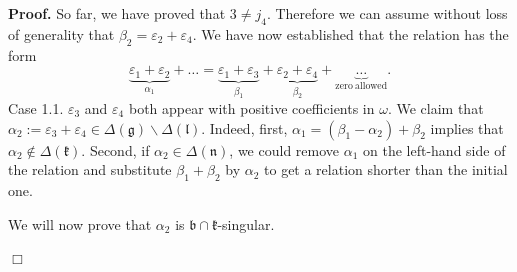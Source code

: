 \documentclass[12pt]{report}
\newenvironment{proof}[1][]{ \textbf{Proof#1. }}{$\Box$\medskip}
\newcommand{\kk}{\mathfrak{k}}
\newcommand{\nn}{\mathfrak{n}}
\newcommand{\gG}{\mathfrak{g}}
\newcommand{\bb}{\mathfrak{b}}
\newcommand{\lL}{\mathfrak{l}}
\newcommand{\eps}{\varepsilon}
\begin{document}
\begin{proof}
So far, we have proved that $3\neq j_4$. Therefore we can assume without loss of generality that $\beta_2=\eps_2+\eps_4$. We have now established that the relation has the form
\[
\underbrace{\eps_{1}+\eps_{2}}_{\alpha_1}+\dots= \underbrace{\eps_{1}+\eps_{3}}_{\beta_1}+\underbrace{ \eps_{2} +\eps_{4}}_{\beta_2}+\underbrace{\dots}_{\mathrm{zero~allowed}}.
\]
\noindent Case 1.1. $\eps_{3}$ and $\eps_{4}$ both appear with positive coefficients in $\omega$. We claim that $\alpha_2:= \eps_{3}+ \eps_{4} \in \Delta(\gG)\backslash\Delta(\lL)$. Indeed, first, $\alpha_1=(\beta_1-\alpha_2)+\beta_2$ implies that $\alpha_2 \notin\Delta(\kk)$. Second, if $\alpha_2\in\Delta(\nn)$, we could remove $\alpha_1$ on the left-hand side of the relation and substitute $\beta_1+\beta_2$ by $\alpha_2$ to get a relation shorter than the initial one.

We will now prove that $\alpha_2$ is $\bb\cap\kk$-singular.


\end{proof}
\end{document}
